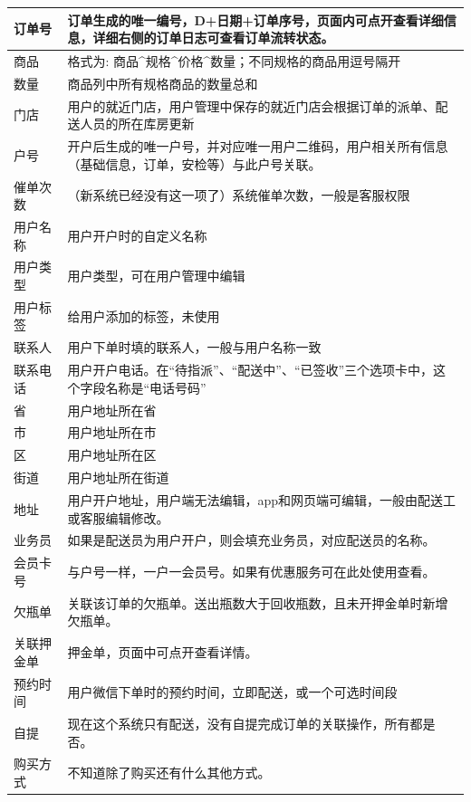 \documentclass[UTF8]{ctexart}
\begin{document}
\begin{longtable}[h!]{ | m{3cm} | m{12cm} | } 

		\hline
		订单号 & 订单生成的唯一编号，D+日期+订单序号，页面内可点开查看详细信息，详细右侧的订单日志可查看订单流转状态。\\
		\hline
		商品 & 格式为: 商品\^{}规格\^{}价格\^{}数量；不同规格的商品用逗号隔开\\
		\hline
		数量 & 商品列中所有规格商品的数量总和\\
		\hline
		门店 & 用户的就近门店，用户管理中保存的就近门店会根据订单的派单、配送人员的所在库房更新\\
		\hline
		户号 & 开户后生成的唯一户号，并对应唯一用户二维码，用户相关所有信息（基础信息，订单，安检等）与此户号关联。\\
		\hline
		催单次数 & （新系统已经没有这一项了）系统催单次数，一般是客服权限\\
		\hline
		用户名称& 用户开户时的自定义名称\\
		\hline
		用户类型& 用户类型，可在用户管理中编辑\\
		\hline
		用户标签& 给用户添加的标签，未使用\\
		\hline
		联系人& 用户下单时填的联系人，一般与用户名称一致\\
		\hline
		联系电话& 用户开户电话。在“待指派”、“配送中”、“已签收”三个选项卡中，这个字段名称是“电话号码”\\
		\hline
		省& 用户地址所在省\\
		\hline
		市& 用户地址所在市\\
		\hline
		区& 用户地址所在区\\
		\hline
		街道& 用户地址所在街道\\
		\hline
		地址& 用户开户地址，用户端无法编辑，app和网页端可编辑，一般由配送工或客服编辑修改。 \\
		\hline
		业务员& 如果是配送员为用户开户，则会填充业务员，对应配送员的名称。\\
		\hline
		会员卡号& 与户号一样，一户一会员号。如果有优惠服务可在此处使用查看。\\
		\hline
		欠瓶单& 关联该订单的欠瓶单。送出瓶数大于回收瓶数，且未开押金单时新增欠瓶单。\\
		\hline
		关联押金单& 押金单，页面中可点开查看详情。\\
		\hline
		预约时间& 用户微信下单时的预约时间，立即配送，或一个可选时间段\\
		\hline
		自提& 现在这个系统只有配送，没有自提完成订单的关联操作，所有都是否。\\
		\hline
		购买方式& 不知道除了购买还有什么其他方式。 \\

\end{longtable}
\end{document}
